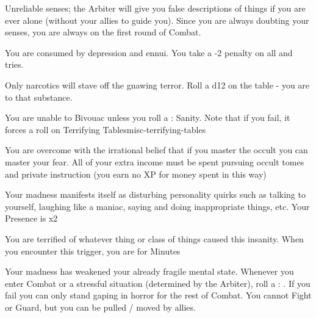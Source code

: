 {  

  Unreliable senses; the Arbiter will give you false descriptions of things if you are ever alone (without your allies to guide you). Since you are always doubting your senses, you are always  on the first round of Combat.


  You are consumed by depression and ennui. You take a -2 penalty on all \RO and \RB tries.


  Only narcotics will stave off the gnawing terror. Roll a d12 on the  table - you are  to that substance.


  You are unable to Bivouac unless you roll a \RS : Sanity.  Note that if you fail, it forces a roll on {Terrifying Tables}{misc-terrifying-tables}


  You are overcome with the irrational belief that if you master the occult you can master your fear. All of your extra income must be spent pursuing occult tomes and private instruction (you earn no XP for money spent in this way)


  Your madness manifests itself as disturbing personality quirks such as talking to yourself, laughing like a maniac, saying and doing inappropriate things, etc. Your \MAX Presence is \DCDOWN x2 


  You are terrified of whatever thing or class of things caused this insanity.  When you encounter this trigger, you are  for Minutes


  Your madness has weakened your already fragile mental state.  Whenever you enter Combat or a stressful situation (determined by the Arbiter), roll a \RS : \INT.  If you fail you can only stand gaping in horror for the rest of Combat.  You cannot Fight or Guard, but you can be pulled / moved by allies.

}
